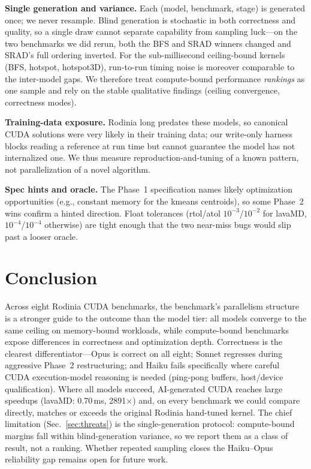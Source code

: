 \documentclass[conference]{IEEEtran}
\begin{document}
\textbf{Single generation and variance.} Each (model, benchmark, stage) is
generated once; we never resample. Blind generation is stochastic in both
correctness and quality, so a single draw cannot separate capability from
sampling luck---on the two benchmarks we did rerun, both the BFS and SRAD
winners changed and SRAD's full ordering inverted. For the sub-millisecond
ceiling-bound kernels (BFS, hotspot, hotspot3D), run-to-run timing noise is
moreover comparable to the inter-model gaps. We therefore treat compute-bound
performance \emph{rankings} as one sample and rely on the stable qualitative
findings (ceiling convergence, correctness modes).

\textbf{Training-data exposure.} Rodinia long predates these models, so canonical
CUDA solutions were very likely in their training data; our write-only harness
blocks reading a reference at run time but cannot guarantee the model has not
internalized one. We thus measure reproduction-and-tuning of a known pattern,
not parallelization of a novel algorithm.

\textbf{Spec hints and oracle.} The Phase~1 specification names likely
optimization opportunities (e.g., constant memory for the kmeans centroids), so
some Phase~2 wins confirm a hinted direction. Float tolerances (rtol/atol
$10^{-3}$/$10^{-2}$ for lavaMD, $10^{-4}$/$10^{-4}$ otherwise) are tight enough
that the two near-miss bugs would slip past a looser oracle.

\section{Conclusion}

Across eight Rodinia CUDA benchmarks, the benchmark's parallelism structure is
a stronger guide to the outcome than the model tier: all models converge to the
same ceiling on memory-bound workloads, while compute-bound benchmarks expose
differences in correctness and optimization depth. Correctness is the clearest
differentiator---Opus is correct on all eight; Sonnet regresses during
aggressive Phase~2 restructuring; and Haiku fails specifically where careful
CUDA execution-model reasoning is needed (ping-pong buffers, host/device
qualification). Where all models succeed, AI-generated CUDA reaches large
speedups (lavaMD: 0.70\,ms, 2891$\times$) and, on every benchmark we could
compare directly, matches or exceeds the original Rodinia hand-tuned kernel.
The chief limitation (Sec.~\ref{sec:threats}) is the single-generation protocol:
compute-bound margins fall within blind-generation variance, so we report them
as a class of result, not a ranking. Whether repeated sampling closes the
Haiku--Opus reliability gap remains open for future work.
\end{document}
